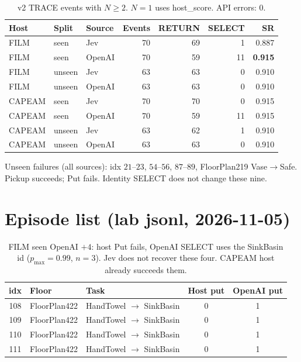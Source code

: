 \documentclass[11pt]{article}
\begin{document}
\begin{table}[t]
\centering
\caption{v2 TRACE events with $N\ge 2$. $N{=}1$ uses host\_score. API errors: 0.}
\label{tab:thor-select}
\scriptsize
\begin{tabular}{lllrrrr}
\toprule
Host & Split & Source & Events & RETURN & SELECT & SR \\
\midrule
FILM & seen & Jev & 70 & 69 & 1 & 0.887 \\
FILM & seen & OpenAI & 70 & 59 & 11 & \textbf{0.915} \\
FILM & unseen & Jev & 63 & 63 & 0 & 0.910 \\
FILM & unseen & OpenAI & 63 & 63 & 0 & 0.910 \\
CAPEAM & seen & Jev & 70 & 70 & 0 & 0.915 \\
CAPEAM & seen & OpenAI & 70 & 59 & 11 & 0.915 \\
CAPEAM & unseen & Jev & 63 & 62 & 1 & 0.910 \\
CAPEAM & unseen & OpenAI & 63 & 63 & 0 & 0.910 \\
\bottomrule
\end{tabular}
\end{table}

Unseen failures (all sources): idx $21$--$23$, $54$--$56$, $87$--$89$, FloorPlan219 Vase$\to$Safe. Pickup succeeds; Put fails. Identity SELECT does not change these nine.

\section{Episode list (lab jsonl, 2026-11-05)}
\label{sec:episodes}

\begin{table}[t]
\centering
\caption{FILM seen OpenAI $+4$: host Put fails, OpenAI SELECT uses the SinkBasin id ($p_{\max}{=}0.99$, $n{=}3$). Jev does not recover these four. CAPEAM host already succeeds them.}
\label{tab:film-gain}
\scriptsize
\begin{tabular}{cllcc}
\toprule
idx & Floor & Task & Host put & OpenAI put \\
\midrule
108 & FloorPlan422 & HandTowel $\to$ SinkBasin & 0 & 1 \\
109 & FloorPlan422 & HandTowel $\to$ SinkBasin & 0 & 1 \\
110 & FloorPlan422 & HandTowel $\to$ SinkBasin & 0 & 1 \\
111 & FloorPlan422 & HandTowel $\to$ SinkBasin & 0 & 1 \\
\bottomrule
\end{tabular}
\end{table}
\end{document}
